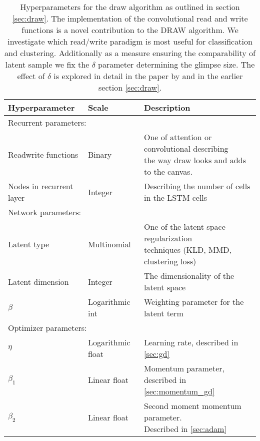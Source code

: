 \begin{table}
\centering
\caption{Hyperparameters for the draw algorithm as outlined in section \ref{sec:draw}. The implementation of the convolutional read and write functions is a novel contribution to the DRAW algorithm. We investigate which read/write paradigm is most useful for classification and clustering. Additionally as a measure ensuring the comparability of latent sample we fix the $\delta$ parameter determining the glimpse size. The effect of $\delta$ is explored in detail in the paper by \citet{Gregor2015} and in the earlier section \ref{sec:draw}.}\label{tab:draw_hyperparams}
\setlength{\extrarowheight}{15pt}
\hspace*{-0.5in}
\begin{tabular}{lll}
\toprule
Hyperparameter & Scale & Description \\
\midrule
\multicolumn{3}{l}{Recurrent parameters: } \\
\midrule
Read\/write functions & Binary & \makecell[l]{One of attention or convolutional describing  \\ the way draw looks and adds to the canvas.} \\
Nodes in recurrent layer & Integer & Describing the number of cells in the LSTM cells \\
\midrule
\multicolumn{3}{l}{Network parameters: } \\
\midrule
Latent type & Multinomial & \makecell[l]{One of the latent space regularization \\techniques (KLD, MMD, clustering loss)} \\
Latent dimension & Integer & The dimensionality of the latent space \\
$\beta$ & Logarithmic int & Weighting parameter for the latent term \\
\midrule
\multicolumn{3}{l}{Optimizer parameters: } \\
\midrule
$\eta$ & Logarithmic float & Learning rate, described in \ref{sec:gd} \\
$\beta_1$ & Linear float & Momentum parameter, described in \ref{sec:momentum_gd} \\
$\beta_2$ & Linear float & \makecell[l]{Second moment momentum parameter. \\ Described in \ref{sec:adam}}\\
\bottomrule
\end{tabular}
\end{table}
